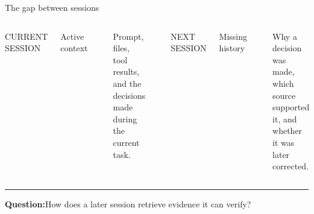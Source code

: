 \documentclass[aspectratio=169,11pt]{beamer}
\newcommand{\amlabel}[1]{\textcolor{amMuted}{\scriptsize\ttfamily #1}}
\newcommand{\amrule}{\textcolor{amLine}{\rule{\linewidth}{0.45pt}}}
\begin{document}
\begin{frame}{The gap between sessions}
  \begin{columns}[T,onlytextwidth]
      \amlabel{CURRENT SESSION}
      \vspace{0.16cm}

      {\fontsize{25}{30}\selectfont\ttfamily\color{amText}Active context\par}
      \vspace{0.16cm}
      \amrule
      \vspace{0.24cm}
      \large
      Prompt, files, tool results, and the decisions made during the current task.

      \centering\textcolor{amLine}{\rule{0.45pt}{3.8cm}}

      \amlabel{NEXT SESSION}
      \vspace{0.16cm}

      {\fontsize{25}{30}\selectfont\ttfamily\color{amCoral}Missing history\par}
      \vspace{0.16cm}
      \amrule
      \vspace{0.24cm}
      \large
      Why a decision was made, which source supported it, and whether it was later corrected.
  \end{columns}

  \vfill
  \amrule
  \vspace{0.18cm}
  {\large\color{amText}\textbf{Question:}\quad How does a later session retrieve evidence it can verify?\par}
\end{frame}
\end{document}
